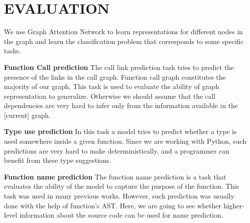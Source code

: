 \documentclass[a4paper,twoside]{article}
\begin{document}
\section{\uppercase{Evaluation}}

We use Graph Attention Network to learn representations for different nodes in the graph and learn the classification problem that corresponds to some specific tasks. 


\textbf{Function Call prediction}
The call link prediction task tries to predict the presence of the links in the call graph. Function call graph constitutes the majority of our graph, This task is used to evaluate the ability of graph representation to generalize. Otherwise we should assume that the call dependencies are very hard to infer only from the information available in the [current] graph. 

\textbf{Type use prediction}
In this task a model tries to predict whether a type is used somewhere inside a given function. Since we are working with Python, such predictions are very hard to make deterministically, and a programmer can benefit from these type suggestions. 

\textbf{Function name prediction}
The function name prediction is a task that evaluates the ability of the model to capture the purpose of the function. This task was used in many previous works. However, such prediction was usually done with the help of function's AST. Here, we are going to see whether higher-level information about the source code can be used for name prediction. 
\end{document}
